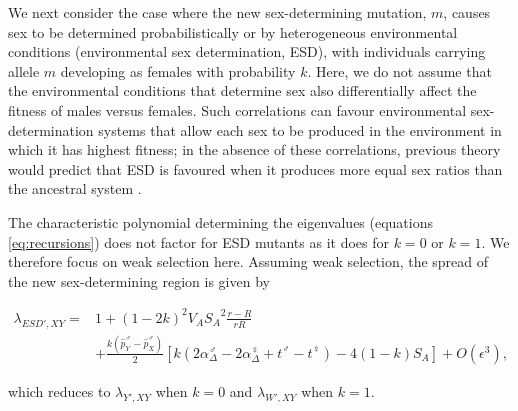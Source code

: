 \documentclass[12pt]{article}
\begin{document}
We next consider the case where the new sex-determining mutation, $m$, causes sex to be determined probabilistically or by heterogeneous environmental conditions (environmental sex determination, ESD), with individuals carrying allele $m$ developing as females with probability $k$.
Here, we do not assume that the environmental conditions that determine sex also differentially affect the fitness of males versus females. 
Such correlations can favour environmental sex-determination systems that allow each sex to be produced in the environment in which it has highest fitness; in the absence of these correlations, previous theory would predict that ESD is favoured when it produces more equal sex ratios than the ancestral system \citep[see reviews by][]{Charnov:1982wg,Bull:1983vi,West:2009we}. %

The characteristic polynomial determining the eigenvalues (equations \ref{eq:recursions}) does not factor for ESD mutants as it does for $k=0$ or $k=1$. 
We therefore focus on weak selection here. 
Assuming weak selection, the spread of the new sex-determining region is given by 

\begin{equation}
\begin{split}
\lambda_{ESD',XY} =& 1 + (1-2k)^2V_{A}{S_{A}}^2\frac{r-R}{r R} \\
&+\frac{k(\hat{p}^\male_Y-\hat{p}^\male_X)}{2}\left[ k \left(2\alpha_{\Delta}^\male-2\alpha_{\Delta}^\female+t^\male-t^\female \right) -4(1-k)S_{A}\right]+O\left(\epsilon^3\right),
\end{split}
\label{eq:lambda_ESD_k}
\end{equation}

\noindent
which reduces to $\lambda_{Y',XY}$ when $k=0$ and $\lambda_{W',XY}$ when $k=1$. 
\end{document}
